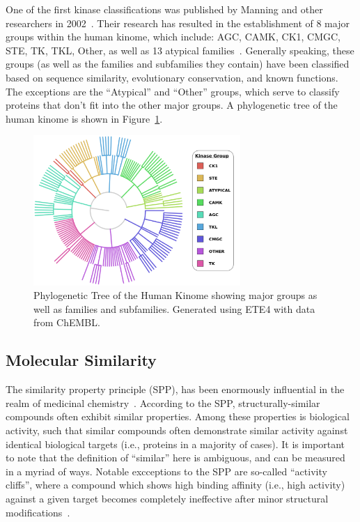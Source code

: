 \documentclass[11pt]{article}
\begin{document}
One of the first kinase classifications was published by Manning and other researchers in 2002~\cite{manning_2002}. 
Their research has resulted in the establishment of 8 major groups within the human kinome, which include: AGC, CAMK, CK1, CMGC, STE, TK, TKL, Other, as well as 13 atypical families~\cite{eid_turk_volkamer_rippmann_fulle_2017}.
Generally speaking, these groups (as well as the families and subfamilies they contain) have been classified based on sequence similarity, evolutionary conservation, and known functions. The exceptions are the ``Atypical'' and ``Other'' groups, which serve to classify proteins that don't fit into the other major groups. 
A phylogenetic tree of the human kinome is shown in Figure~\ref{fig:fam_tree}. %

\begin{figure}[H]
    \centering
    \includegraphics[width=0.7\textwidth]{../figures/protein_family_tree.png}
    \caption{Phylogenetic Tree of the Human Kinome showing major groups as well as families and subfamilies. Generated using ETE4 with data from ChEMBL.}
    \label{fig:fam_tree}
\end{figure}


\subsection{Molecular Similarity}
The similarity property principle (SPP), has been enormously influential in the realm of medicinal chemistry~\cite{maggiora_vogt_stumpfe_bajorath_2013}. 
According to the SPP, structurally-similar compounds often exhibit similar properties. 
Among these properties is biological activity, such that similar compounds often demonstrate similar activity against identical biological targets (i.e., proteins in a majority of cases). 
It is important to note that the definition of “similar” here is ambiguous, and can be measured in a myriad of ways.
Notable excceptions to the SPP are so-called ``activity cliffs'', where a compound which shows high binding affinity (i.e., high activity) against a given target becomes completely ineffective after minor structural modifications~\cite{maggiora_vogt_stumpfe_bajorath_2013,filip_miljkovic_jurgen_bajorath_2018}. 
\end{document}
